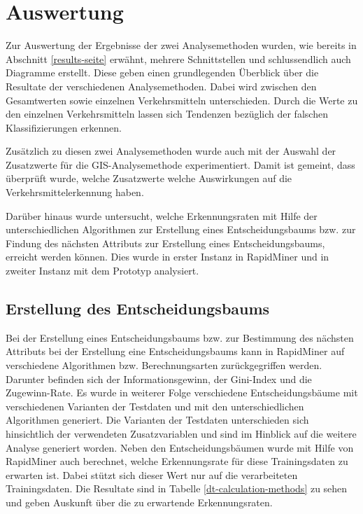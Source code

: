 \chapter{Auswertung}
\label{auswertung}

Zur Auswertung der Ergebnisse der zwei Analysemethoden wurden, wie bereits in Abschnitt \ref{results-seite}   erwähnt, mehrere Schnittstellen und schlussendlich auch Diagramme erstellt. Diese geben einen grundlegenden Überblick über die Resultate der verschiedenen Analysemethoden. Dabei wird zwischen den Gesamtwerten sowie einzelnen Verkehrsmitteln unterschieden. Durch die Werte zu den einzelnen Verkehrsmitteln lassen sich Tendenzen bezüglich der falschen Klassifizierungen erkennen. 
 
Zusätzlich zu diesen zwei Analysemethoden wurde auch mit der Auswahl der Zusatzwerte für die GIS-Analysemethode experimentiert. Damit ist gemeint, dass überprüft wurde, welche Zusatzwerte welche Auswirkungen auf die Verkehrsmittelerkennung haben. 

Darüber hinaus wurde untersucht, welche Erkennungsraten mit Hilfe der unterschiedlichen Algorithmen zur Erstellung eines Entscheidungsbaums bzw. zur Findung des nächsten Attributs zur Erstellung eines Entscheidungsbaums, erreicht werden können. Dies wurde in erster Instanz in RapidMiner und in zweiter Instanz mit dem Prototyp analysiert.
\clearpage

\section{Erstellung des Entscheidungsbaums}
\label{rapidMinerResultat}
Bei der Erstellung eines Entscheidungsbaums bzw. zur Bestimmung des nächsten Attributs bei der Erstellung eine Entscheidungsbaums kann in RapidMiner auf verschiedene Algorithmen bzw. Berechnungsarten zurückgegriffen werden. Darunter befinden sich der Informationsgewinn, der Gini-Index und die Zugewinn-Rate. Es wurde in weiterer Folge verschiedene Entscheidungsbäume mit verschiedenen Varianten der Testdaten und mit den unterschiedlichen Algorithmen generiert. Die Varianten der Testdaten unterschieden sich hinsichtlich der verwendeten Zusatzvariablen und sind im Hinblick auf die weitere Analyse generiert worden. Neben den Entscheidungsbäumen wurde mit Hilfe von RapidMiner auch berechnet, welche Erkennungsrate für diese Trainingsdaten zu erwarten ist. Dabei stützt sich dieser Wert nur auf die verarbeiteten Trainingsdaten. Die Resultate sind in Tabelle \ref{dt-calculation-methods} zu sehen und geben Auskunft über die zu erwartende Erkennungsraten. 

